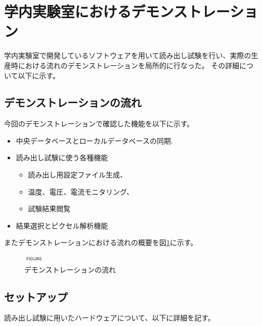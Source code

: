 \section{学内実験室におけるデモンストレーション}
学内実験室で開発しているソフトウェアを用いて読み出し試験を行い、実際の生産時における流れのデモンストレーションを局所的に行なった。
その詳細について以下に示す。

\subsection{デモンストレーションの流れ}

今回のデモンストレーションで確認した機能を以下に示す。
\begin{itemize}
  \item 中央データベースとローカルデータベースの同期.
  \item 読み出し試験に使う各種機能
   \begin{itemize}
     \item 読み出し用設定ファイル生成、
     \item 温度、電圧、電流モニタリング、
     \item 試験結果閲覧
   \end{itemize}
  \item 結果選択とピクセル解析機能
\end{itemize}

またデモンストレーションにおける流れの概要を図\ref{demo_flow}に示す。

\begin{figure}[bpt]\centering
\includegraphics[width=1cm]{figure}
\caption[デモンストレーションの流れ]{デモンストレーションの流れ}
\label{demo_flow}
\end{figure}


\subsection{セットアップ}
読み出し試験に用いたハードウェアについて、以下に詳細を記す。

